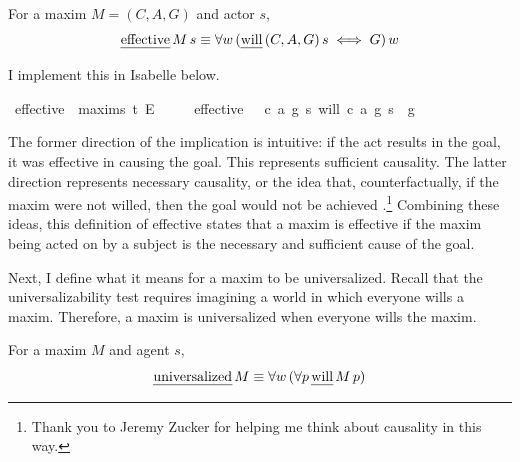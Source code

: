 \begin{isabellebody}
\begin{isamarkuptext}
\begin{definition}
For a maxim $M = (C, A, G)$ and actor $s$,
$$\text{\emph{effective}} \, M \, s \equiv \forall w \, (\text{\emph{will}} \, (C, A, G) \, s \iff G) \, w$$
\end{definition}
\noindent I implement this in Isabelle below.%
\end{isamarkuptext}\isamarkuptrue%
\isamarkupfalse%
\ effective\ {\isacharcolon}{\isacharcolon}\ {\isachardoublequoteopen}maxim{\isasymRightarrow}s{\isasymRightarrow}\ t{\isachardoublequoteclose}\ {\isacharparenleft}{\isachardoublequoteopen}E\ {\isacharunderscore}\ {\isacharunderscore}{\isachardoublequoteclose}{\isacharparenright}\isanewline
\ \ \ {\isachardoublequoteopen}effective\ \ {\isasymequiv}\ {\isasymlambda}{\isacharparenleft}c{\isacharcomma}\ a{\isacharcomma}\ g{\isacharparenright}\ s{\isachardot}\ {\isacharparenleft}{\isacharparenleft}will\ {\isacharparenleft}c{\isacharcomma}\ a{\isacharcomma}\ g{\isacharparenright}\ s{\isacharparenright}\ \isactrlbold {\isasymequiv}\ g{\isacharparenright}{\isachardoublequoteclose}\isanewline
%
%
\begin{isamarkuptext}%
The former direction of the implication is intuitive: if the act results in the goal, it was 
effective in causing the goal. This represents sufficient causality. The latter direction represents 
necessary causality, or the idea that, counterfactually, if the maxim were not willed, then the goal 
would not be achieved \citep{lewiscausality}.\footnote{Thank you to Jeremy Zucker for helping me 
think about causality in this way.}
Combining these ideas, this definition of effective states that a maxim is effective if the 
maxim being acted on by a subject is the necessary and sufficient cause of the goal.

Next, I define what it means for a maxim to be universalized. Recall that the universalizability 
test requires imagining a world in which everyone wills a maxim. Therefore, a maxim is universalized
when everyone wills the maxim. 

\begin{definition}[Universalized]
  For a maxim $M$ and agent $s$,
$$\text{\emph{universalized}} \, M  \equiv \forall w \, (\forall p \, \text{\emph{will}} \, M \, p)$$
\end{definition}


\end{isamarkuptext}
\end{isabellebody}
